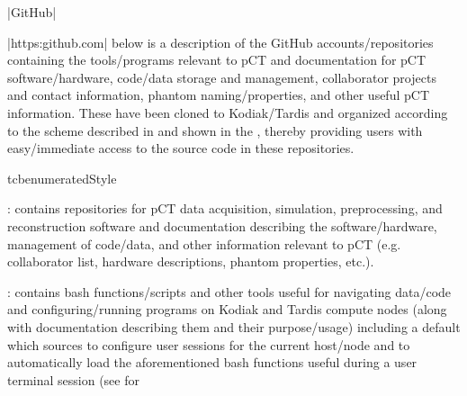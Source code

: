 \begin{tcbenvironment}|GitHub|
\begin{tcbparbox}|https:\dirsep\dirsep github.com\dirsep{}\dirsep{}|
\bfdash below is a description of the GitHub accounts/repositories containing the tools/programs relevant to pCT and documentation for pCT software/hardware, code/data storage and management, collaborator projects and contact information, phantom naming/properties, and other useful pCT information.  These have been cloned to Kodiak/Tardis and organized according to the scheme described in  and shown in the , thereby providing users with easy/immediate access to the source code in these repositories.
\end{tcbparbox}
\def\currentparsep{3.0pt}
\begin{tcbparbox}{tcbenumeratedStyle}
\begin{ThinEnum}[parsep=\currentparsep]
    \item {} : contains repositories for pCT data acquisition, simulation, preprocessing, and reconstruction software and documentation describing the software/hardware, management of code/data, and other information relevant to pCT (e.g. collaborator list, hardware descriptions, phantom properties, etc.).
    \begin{ThinEnum}[parsep=\currentparsep]
        \item {} : contains bash functions/scripts and other tools useful for navigating data/code and configuring/running programs on Kodiak and Tardis compute nodes (along with documentation describing them and their purpose/usage) including a default  which sources  to configure user sessions for the current host/node and  to automatically load the aforementioned bash functions useful during a user terminal session (see  for

\end{ThinEnum}
\end{ThinEnum}
\end{tcbparbox}
\end{tcbenvironment}

